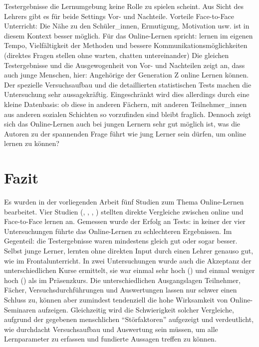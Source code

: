 Testergebnisse die Lernumgebung keine Rolle zu spielen scheint. Aus
Sicht des Lehrers gibt es für beide Settings Vor- und Nachteile.
Vorteile Face-to-Face Unterricht: Die Nähe zu den Schüler\_innen,
Ermutigung, Motivation usw. ist in diesem Kontext besser möglich. Für
das Online-Lernen spricht: lernen im eigenen Tempo, Vielfältigkeit der
Methoden und bessere Kommunikationsmöglichkeiten (direktes Fragen
stellen ohne warten, chatten untereinander) Die gleichen Testergebnisse
und die Ausgewogenheit von Vor- und Nachteilen zeigt an, dass auch junge
Menschen, hier: Angehörige der Generation Z online Lernen können. Der
spezielle Versuchsaufbau und die detaillierten statistischen Tests
machen die Untersuchung sehr aussagekräftig. Eingeschränkt wird dies
allerdings durch eine kleine Datenbasis: ob diese in anderen Fächern,
mit anderen Teilnehmer\_innen aus anderen sozialen Schichten so
vorzufinden sind bleibt fraglich. Dennoch zeigt sich das Online-Lernen
auch bei jungen Lernern sehr gut möglich ist, was die Autoren zu der
spannenden Frage führt wie jung Lerner sein dürfen, um online lernen zu
können?

\section{Fazit}\label{fazit}

Es wurden in der vorliegenden Arbeit fünf Studien zum Thema
Online-Lernen bearbeitet. Vier Studien
(\parencite{hohenberg2009erfolgreiches}, \parencite{Fischer2014a},
\parencite{mentzer2007two}, \parencite{Edwards2013}) stellten direkte
Vergleiche zwischen online und Face-to-Face lernen an. Gemessen wurde
der Erfolg an Tests: in keiner der vier Untersuchungen führte das
Online-Lernen zu schlechteren Ergebnissen. Im Gegenteil: die
Testergebnisse waren mindestens gleich gut oder sogar besser. Selbst
junge Lerner, lernten ohne direkten Input durch einen Lehrer genauso
gut, wie im Frontalunterricht. In zwei Untersuchungen wurde auch die
Akzeptanz der unterschiedlichen Kurse ermittelt, sie war einmal sehr
hoch (\parencite{Nistor2005a}) und einmal weniger hoch
(\parencite{mentzer2007two}) als im Präsenzkurs. Die unterschiedlichen
Ausgangslagen Teilnehmer, Fächer, Versuchsdurchführungen und
Auswertungen lassen nur schwer einen Schluss zu, können aber zumindest
tendenziell die hohe Wirksamkeit von Online-Seminaren aufzeigen.
Gleichzeitig wird die Schwierigkeit solcher Vergleiche, aufgrund der
gegebenen menschlichen ``Störfaktoren'' aufgezeigt und verdeutlicht, wie
durchdacht Versuchsaufbau und Auswertung sein müssen, um alle
Lernparameter zu erfassen und fundierte Aussagen treffen zu können.
